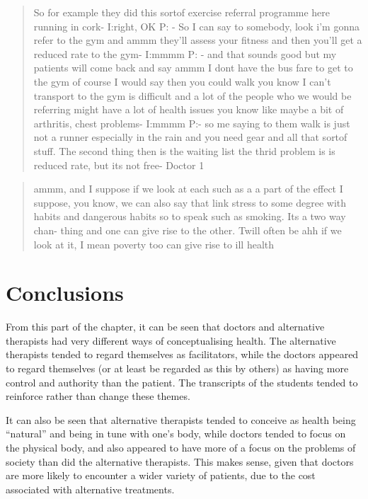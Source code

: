 \begin{quotation}
  So for example they did this sortof exercise referral programme here running in cork-
I:right, OK
P: - So I can say to somebody, look i'm gonna refer to the gym and ammm they'll assess your fitness  and then you'll get a reduced rate to the gym-
I:mmmm
P: - and that sounds good but my patients will come back and say ammm I dont have the bus fare to get to the gym of course I would say then you could walk you know I can't transport to the gym is difficult and a lot of the people who we would be referring might have a lot of health issues you know like maybe a bit of arthritis, chest problems-
I:mmmm
P:- so me saying to them walk is just not a runner especially in the rain and you need gear and all that sortof stuff. The second thing then is the waiting list the thrid problem is is reduced rate, but its not free-
Doctor 1
\end{quotation}


\begin{quotation}
  ammm, and I suppose if we look at each such as a a part of the effect I suppose, you know, we can also say that link stress to some degree with habits and dangerous habits so to speak such as smoking. Its a two way chan- thing and one can give rise to the other. Twill often be ahh if we look at it, I mean poverty too can give rise to ill health
\end{quotation}


\section{Conclusions}
\label{sec:conclusions}

From this part of the chapter, it can be seen that doctors and alternative therapists had very different ways of conceptualising health. The alternative therapists tended to regard themselves as facilitators, while the doctors appeared to regard themselves (or at least be regarded as this by others) as having more control and authority than the patient. 
The transcripts of the students tended to reinforce rather than change these themes. 

It can also be seen that alternative therapists tended to conceive as health being ``natural'' and being in tune with one's body, while doctors tended to focus on the physical body, and also appeared to have more of a focus on the problems of society than did the alternative therapists. This makes sense, given that doctors are more likely to encounter a wider variety of patients, due to the cost associated with alternative treatments. 

